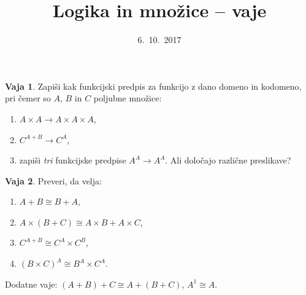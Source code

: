 \documentclass{article}
\theoremstyle{definition}
\newtheorem{vaja}{Vaja}
\begin{document}
\title{Logika in množice -- vaje}
\date{6.~10.~2017}
\maketitle

\begin{vaja}
  Zapiši kak funkcijski predpis za funkcijo z dano domeno in kodomeno,
  pri čemer so $A$, $B$ in $C$ poljubne množice:
  \begin{enumerate}
  \item $A \times A \to A \times A \times A$,
  \item $C^{A+B} \to C^A$,
  \item zapiši \emph{tri} funkcijske predpise $A^A \to A^A$. Ali določajo različne preslikave?
  \end{enumerate}
\end{vaja}

\begin{vaja}
  Preveri, da velja:
  \begin{enumerate}
  \item $A + B \cong B + A$,
  \item $A \times (B + C) \cong A \times B + A \times C$,
  \item $C^{A + B} \cong C^A \times C^B$,
  \item $(B \times C)^A \cong B^A \times C^A$.
  \end{enumerate}
  Dodatne vaje: $(A + B) + C \cong A + (B + C)$, $A^1 \cong A$.
\end{vaja}
\end{document}
